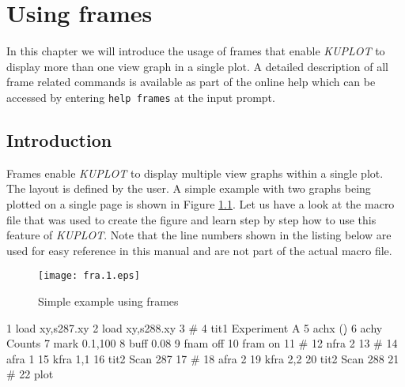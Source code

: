 
\chapter{Using frames \label {frame}}

In this chapter we will introduce the usage of frames that enable
{\it KUPLOT} to display more than one view graph in a single plot. A
detailed description of all frame related commands is available as
part of the online help which can be accessed by entering {\tt help
frames} at the input prompt.


\section{Introduction \label{frame-int}}

Frames enable {\it KUPLOT} to display multiple view graphs within a
single plot. The layout is defined by the user. A simple example with
two graphs being plotted on a single page is shown in Figure
\ref{fra-fig1}. Let us have a look at the macro file that was used to
create the figure and learn step by step how to use this
feature of {\it KUPLOT}. Note that the line numbers shown in the
listing below are used for easy reference in this manual and are not
part of the actual macro file.

\begin{figure}[!b]
   \centering
   \texttt{[image: fra.1.eps]}
   \caption{Simple example using frames}
   \label{fra-fig1}
\end{figure}

\begin{MacVerbatim}
     1  load xy,s287.xy
     2  load xy,s288.xy
     3  #
     4  tit1 Experiment A
     5  achx \gw (\uo\d)
     6  achy Counts
     7  mark 0.1,100
     8  buff 0.08
     9  fnam off
    10  fram on
    11  #
    12  nfra 2
    13  #
    14  afra 1
    15  kfra 1,1
    16  tit2 Scan 287
    17  #
    18  afra 2
    19  kfra 2,2
    20  tit2 Scan 288
    21  #
    22  plot
\end{MacVerbatim}

